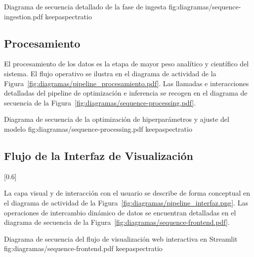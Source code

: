 {Diagrama de secuencia detallado de la fase de ingesta}
{fig:diagramas/sequence-ingestion.pdf}
{keepaspectratio}

\subsection{Procesamiento}

El procesamiento de los datos es la etapa de mayor peso analítico y científico
del sistema. El flujo operativo se ilustra en el diagrama de actividad de la
Figura~\ref{fig:diagramas/pipeline_procesamiento.pdf}. Las llamadas e
interacciones detalladas del pipeline de optimización e inferencia se recogen
en el diagrama de secuencia de la
Figura~\ref{fig:diagramas/sequence-processing.pdf}.

{Diagrama de secuencia de la optimización de hiperparámetros y ajuste del modelo}
{fig:diagramas/sequence-processing.pdf}
{keepaspectratio}

\subsection{Flujo de la Interfaz de Visualización}
[0.6]

La capa visual y de interacción con el usuario se describe de forma conceptual
en el diagrama de actividad de la
Figura~\ref{fig:diagramas/pipeline_interfaz.png}. Las operaciones de
intercambio dinámico de datos se encuentran detalladas en el diagrama de
secuencia de la Figura~\ref{fig:diagramas/sequence-frontend.pdf}.

{Diagrama de secuencia del flujo de visualización web interactiva en Streamlit}
{fig:diagramas/sequence-frontend.pdf}
{keepaspectratio}

